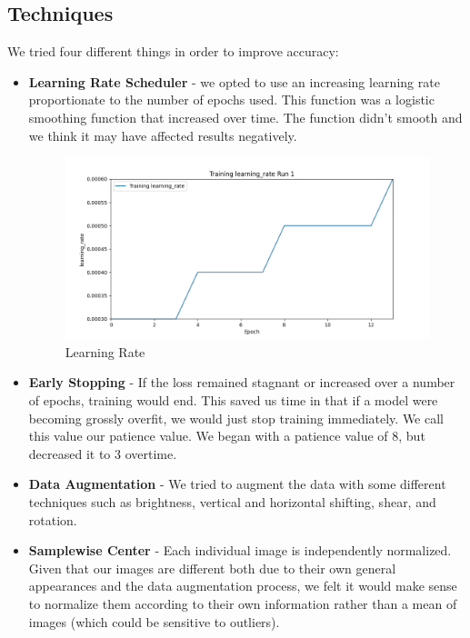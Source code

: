 \subsection{Techniques}
We tried four different things in order to improve accuracy:
\begin{itemize}
    \item \textbf{Learning Rate Scheduler} - we opted to use an increasing learning rate proportionate to the number of epochs used. This function was a logistic smoothing function that increased over time. The function didn't smooth and we think it may have affected results negatively.
    \begin{figure}[h]
        \centering
        \includegraphics[width=\linewidth]{img/training_learning_rate_run_1.png}
        \caption{Learning Rate}
        \label{fig:result1}
    \end{figure}
    
    \item \textbf{Early Stopping} - If the loss remained stagnant or increased over a number of epochs, training would end. This saved us time in that if a model were becoming grossly overfit, we would just stop training immediately. We call this value our patience value. We began with a patience value of 8, but decreased it to 3 overtime.
    \item \textbf{Data Augmentation} - We tried to augment the data with some different techniques such as brightness, vertical and horizontal shifting, shear, and rotation. 
    \item \textbf{Samplewise Center} - Each individual image is independently normalized. Given that our images are different both due to their own general appearances and the data augmentation process, we felt it would make sense to normalize them according to their own information rather than a mean of images (which could be sensitive to outliers).
\end{itemize}


